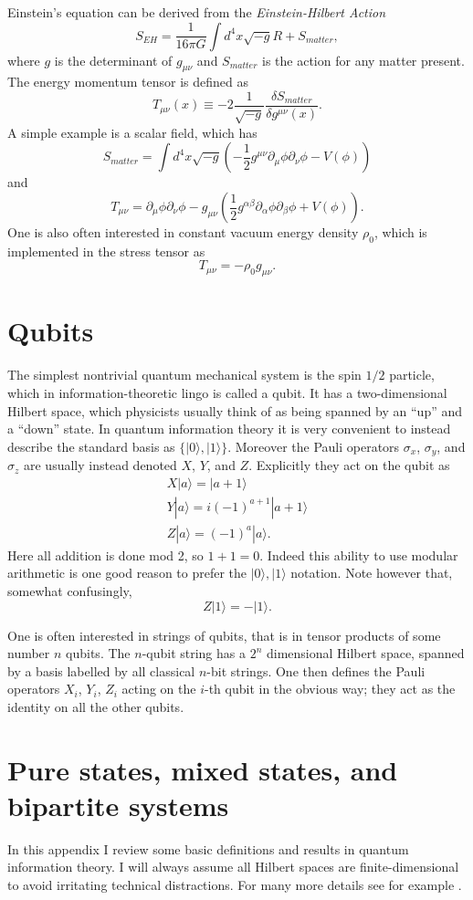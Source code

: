 \documentclass[12pt]{article}
\newcommand{\be}{\begin{equation}}
\newcommand{\ee}{\end{equation}}
\newcommand{\ran}{\rangle}
\begin{document}
Einstein's equation can be derived from the \textit{Einstein-Hilbert Action}
\be
S_{EH}=\frac{1}{16\pi G}\int d^4 x \sqrt{-g}R+S_{matter},
\ee
where $g$ is the determinant of $g_{\mu\nu}$ and $S_{matter}$ is the action for any matter present.  The energy momentum tensor is defined as
\be
T_{\mu\nu}(x)\equiv -2\frac{1}{\sqrt{-g}}\frac{\delta S_{matter}}{\delta g^{\mu\nu}(x)}.
\ee
A simple example is a scalar field, which has
\be
S_{matter}=\int d^4 x \sqrt{-g}\left(-\frac{1}{2} g^{\mu\nu}\partial_\mu \phi \partial_\nu \phi-V(\phi)\right)
\ee
and
\be\label{scalarT}
T_{\mu\nu}=\partial_\mu\phi\partial_\nu \phi-g_{\mu\nu}\left(\frac{1}{2}g^{\alpha\beta}\partial_\alpha \phi \partial_\beta \phi+V(\phi)\right).
\ee
One is also often interested in constant vacuum energy density $\rho_0$, which is implemented in the stress tensor as
\be
T_{\mu\nu}=-\rho_0 g_{\mu\nu}.
\ee

\section{Qubits}\label{qubitapp}
The simplest nontrivial quantum mechanical system is the spin $1/2$ particle, which in information-theoretic lingo is called a qubit.  It has a two-dimensional Hilbert space, which physicists usually think of as being spanned by an ``up'' and a ``down'' state.  In quantum information theory it is very convenient to instead describe the standard basis as $\{|0\ran,|1\ran\}$.  Moreover the Pauli operators $\sigma_x$, $\sigma_y$, and $\sigma_z$ are usually instead denoted $X$, $Y$, and $Z$.  Explicitly they act on the qubit as
\begin{align}\nonumber
X|a\ran=|a+1\ran\\\nonumber
Y|a\ran=i(-1)^{a+1}|a+1\ran\\
Z|a\ran=(-1)^a |a\ran.
\end{align}
Here all addition is done mod 2, so $1+1=0$.  Indeed this ability to use modular arithmetic is one good reason to prefer the $|0\ran,|1\ran$ notation.  Note however that, somewhat confusingly, 
\be
Z|1\ran=-|1\ran.
\ee

One is often interested in strings of qubits, that is in tensor products of some number $n$ qubits.  The $n$-qubit string has a $2^n$ dimensional Hilbert space, spanned by a basis labelled by all classical $n$-bit strings.  One then defines the Pauli operators $X_i$, $Y_i$, $Z_i$ acting on the $i$-th qubit in the obvious way; they act as the identity on all the other qubits.  

\section{Pure states, mixed states, and bipartite systems}\label{BPapp}
In this appendix I review some basic definitions and results in quantum information theory.  I will always assume all Hilbert spaces are finite-dimensional to avoid irritating technical distractions.  For many more details see for example \cite{preskillnotes,nielsen2010quantum}.  
\end{document}
